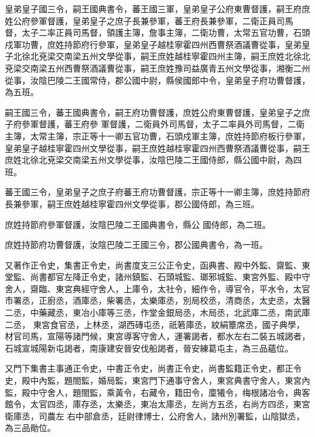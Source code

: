 \begin{pinyinscope}
 皇弟皇子國三令，嗣王國典書令，蕃王國三軍，皇弟皇子公府東曹督護，嗣王府庶姓公府參軍督護，皇弟皇子之庶子長兼參軍，蕃王府長兼參軍，二衛正員司馬
 督，太子二率正員司馬督，領護主簿，詹事主簿，二衛功曹，太常五官功曹，石頭戍軍功曹，庶姓持節府行參軍，皇弟皇子越桂寧霍四州西曹祭酒議曹從事，皇弟皇子北徐北兗梁交南梁五州文學從事，嗣王庶姓越桂寧霍四州主簿，嗣王庶姓北徐北兗梁交南梁五州西曹祭酒議曹從事，嗣王庶姓豫司益廣青五州文學從事，湘衡二州從事，汝陰巴陵二王國常侍，郡公國中尉，縣侯國郎中令，皇弟皇子府功曹督護，為五班。



 嗣王國三令，蕃王國典書令，嗣王府功曹督護，庶姓公府東曹督護，皇弟皇子之庶子府參軍督護，蕃王府參
 軍督護，二衛員外司馬督，太子二率員外司馬督，二衛主簿，太常主簿，宗正等十一卿五官功曹，石頭戍軍主簿，庶姓持節府板行參軍，皇弟皇子越桂寧霍四州文學從事，嗣王庶姓越桂寧霍四州西曹祭酒議曹從事，嗣王庶姓北徐北兗梁交南梁五州文學從事，汝陰巴陵二王國侍郎，縣公國中尉，為四班。



 蕃王國三令，皇弟皇子之庶子府蕃王府功曹督護，宗正等十一卿主簿，庶姓持節府長兼參軍，嗣王庶姓越桂寧霍四州文學從事，郡公國侍郎，為三班。



 庶姓持節府參軍督護，汝陰巴陵二王國典書令，縣公
 國侍郎，為二班。



 庶姓持節府功曹督護，汝陰巴陵二王國三令，郡公國典書令，為一班。



 又著作正令史，集書正令史，尚書度支三公正令史，函典書、殿中外監、齋監、東堂監、尚書都官左降正令史，諸州鎮監、石頭城監、瑯邪城監、東宮外監、殿中守舍人，齋臨、東宮典經守舍人，上庫令，太社令，細作令，導官令，平水令，太官市署丞，正廚丞，酒庫丞，柴署丞，太樂庫丞，別局校丞，清商丞，太史丞，太醫二丞，中藥藏丞，東冶小庫等三丞，作堂金銀局丞，木局丞，北武庫二丞，南武庫二丞，
 東宮食官丞，上林丞，湖西磚屯丞，祇箬庫丞，紋絹簟席丞，國子典學，材官司馬，宣陽等諸門候，東宮導客守舍人，運署謁者，都水左右二裝五城謁者，石城宣城陽新屯謁者，南康建安晉安伐船謁者，晉安練葛屯主，為三品蘊位。



 又門下集書主事通正令史，中書正令史，尚書正令史，尚書監籍正令史，都正令史，殿中內監，題閤監，婚局監，東宮門下通事守舍人，東宮典書守舍人，東宮內監，殿中守舍人，題閤監，乘黃令，右藏令，籍田令，廩犧令，梅根諸冶令，典客館令，太官四丞，庫存丞，太樂丞，東冶太庫丞，左尚方五丞，右尚方四丞，東宮衛庫丞，司農左
 右中部倉丞，廷尉律博士，公府舍人，諸州別署監，山陰獄丞，為三品勛位。




\end{pinyinscope}
